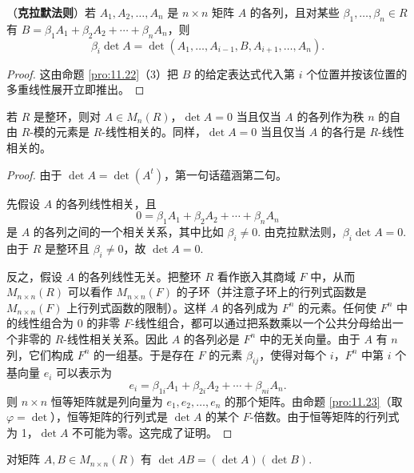 \begin{theorem}\label{thm:11.26}
（\textbf{克拉默法则}）若 \(A_1, A_2, \ldots, A_n\) 是 \(n \times n\) 矩阵 \(A\) 的各列，且对某些 \(\beta_1, \ldots, \beta_n \in R\) 有 \(B = \beta_1A_1+\beta_2A_2+\cdots+\beta_nA_n\)，则
\[
\beta_i\det A = \det(A_1, \ldots, A_{i-1}, B, A_{i+1}, \ldots, A_n).
\]
\end{theorem}

\begin{proof}
这由命题 \ref{pro:11.22}（3）把 \(B\) 的给定表达式代入第 \(i\) 个位置并按该位置的多重线性展开立即推出。
\end{proof}

\begin{corollary}\label{cor:11.27}
若 \(R\) 是整环，则对 \(A \in M_n(R)\)，\(\det A = 0\) 当且仅当 \(A\) 的各列作为秩 \(n\) 的自由 \(R\)-模的元素是 \(R\)-线性相关的。同样，\(\det A = 0\) 当且仅当 \(A\) 的各行是 \(R\)-线性相关的。
\end{corollary}

\begin{proof}
由于 \(\det A = \det(A^t)\)，第一句话蕴涵第二句。

先假设 \(A\) 的各列线性相关，且
\[
0 = \beta_1A_1+\beta_2A_2+\cdots+\beta_nA_n
\]
是 \(A\) 的各列之间的一个相关关系，其中比如 \(\beta_i \neq 0\). 由克拉默法则，\(\beta_i\det A = 0\). 由于 \(R\) 是整环且 \(\beta_i \neq 0\)，故 \(\det A = 0\).

反之，假设 \(A\) 的各列线性无关。把整环 \(R\) 看作嵌入其商域 \(F\) 中，从而 \(M_{n \times n}(R)\) 可以看作 \(M_{n \times n}(F)\) 的子环（并注意子环上的行列式函数是 \(M_{n \times n}(F)\) 上行列式函数的限制）。这样 \(A\) 的各列成为 \(F^n\) 的元素。任何使 \(F^n\) 中的线性组合为 0 的非零 \(F\)-线性组合，都可以通过把系数乘以一个公共分母给出一个非零的 \(R\)-线性相关关系。因此 \(A\) 的各列必是 \(F^n\) 中的无关向量。由于 \(A\) 有 \(n\) 列，它们构成 \(F^n\) 的一组基。于是存在 \(F\) 的元素 \(\beta_{ij}\)，使得对每个 \(i\)，\(F^n\) 中第 \(i\) 个基向量 \(e_i\) 可以表示为
\[
e_i = \beta_{1i}A_1+\beta_{2i}A_2+\cdots+\beta_{ni}A_n.
\]
则 \(n \times n\) 恒等矩阵就是列向量为 \(e_1, e_2, \ldots, e_n\) 的那个矩阵。由命题 \ref{pro:11.23}（取 \(\varphi = \det\)），恒等矩阵的行列式是 \(\det A\) 的某个 \(F\)-倍数。由于恒等矩阵的行列式为 1，\(\det A\) 不可能为零。这完成了证明。
\end{proof}

\begin{theorem}\label{thm:11.28}
对矩阵 \(A, B \in M_{n \times n}(R)\) 有 \(\det AB = (\det A)(\det B)\).
\end{theorem}

